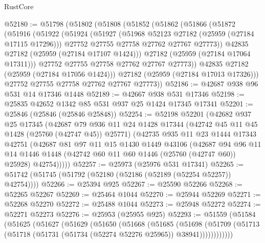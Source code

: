 \begin{lexlean}{RustCore}
\begin{coremodule}
@52180 := @51798
    (@51802
      (@51808
        (@51852
          (@51862
            (@51866
              (@51872
                (@51916
                  (@51922
                    (@51924
                      (@51927
                        (@51968 @52123 @27182 (@25959 (@27184 @17115 @17296)))
                        @27752
                        @27755
                        @27758
                        @27762
                        @27767
                        @27773))
                    @42835
                    @27182
                    (@25959 (@27184 @17107 @1424)))
                  @27182
                  (@25959 (@27184 @17064 @17311)))
                @27752
                @27755
                @27758
                @27762
                @27767
                @27773))
            @42835
            @27182
            (@25959 (@27184 @17056 @1424)))
          @27182
          (@25959 (@27184 @17013 @17326)))
        @27752
        @27755
        @27758
        @27762
        @27767
        @27773))
@52186 := @42687 @938 @96 @531 @14 @17346 @1448
@52189 := @42667 @938 @531 @17346
@52198 := @25835 @42652 @1342 @85 @531 @937 @25 @1424 @17345 @17341
@52201 := @25846 (@25846 (@25846 @25848))
@52254 := @52198
    @52201
    (@42682
      @937
      @25
      @17345
      (@42687
        @79
        @936
        @11
        @24
        @1428
        @17344
        (@42742 @45 @11 @45 @1428 (@25760 (@42747 @45)) @25771)
        (@42735
          @935
          @11
          @23
          @1444
          @17343
          @42751
          (@42687
            @81
            @97
            @11
            @15
            @1430
            @1449
            @43106
            (@42687
              @94
              @96
              @11
              @14
              @1446
              @1448
              (@42742 @60 @11 @60 @1446 (@25760 (@42747 @60)) @25928)
              @42754)))))
@52257 := @25973 (@25976 @531 @17341)
@52265 := @51742 (@51745 (@51792 (@52180 (@52186 (@52189 (@52254 @52257)) @42754))))
@52266 := @25394 @925
@52267 := @25590 @52266
@52268 := @52265 @52267
@52269 := @25464 @1044
@52270 := @25944 @52269
@52271 := @52268 @52270
@52272 := @25488 @1044
@52273 := @25948 @52272
@52274 := @52271 @52273
@52276 := @25953 (@25955 @925)
@52293 := @51559
    (@51584
      (@51625
        (@51627
          (@51629
            (@51650
              (@51668
                (@51685
                  (@51698
                    (@51709
                      (@51713 (@51718 (@51731 (@51734 (@52274 @52276 @25965)) @38941))))))))))))

\end{coremodule}
\end{lexlean}
